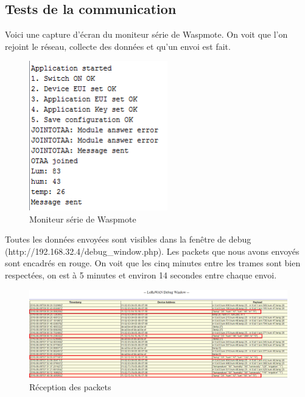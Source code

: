 \subsection{Tests de la communication}
Voici une capture d'écran du moniteur série de Waspmote. On voit que l'on rejoint le réseau, collecte des données et qu'un envoi est fait.
\begin{figure}[H]
	\begin{center}
		\includegraphics[width=6cm]{img/console.png}
		\caption{Moniteur série de Waspmote}
		\label{Moniteur}
	\end{center}
\end{figure}
Toutes les données envoyées sont visibles dans la fenêtre de debug\\ (http://192.168.32.4/debug\_window.php). Les packets que nous avons envoyés sont encadrés en rouge. On voit que les cinq minutes entre les trames sont bien respectées, on est à 5 minutes et environ 14 secondes entre chaque envoi. 
\begin{figure}[H]
	\begin{center}
		\includegraphics[width=17cm]{img/result.png}
		\caption{Réception des packets}
		\label{debug}
	\end{center}
\end{figure}